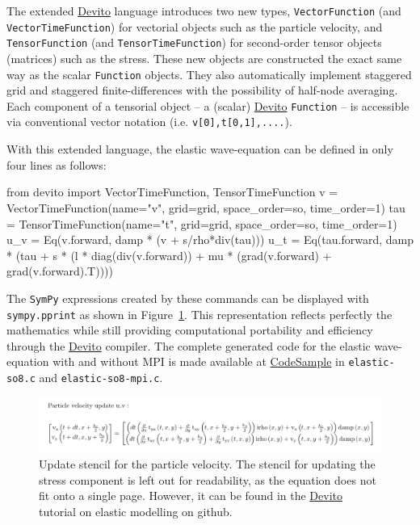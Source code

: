 \documentclass[conference]{IEEEtran}
\begin{document}
The extended \href{https://github.com/devitocodes/devito}{Devito}
language introduces two new types, \texttt{VectorFunction} (and
\texttt{VectorTimeFunction}) for vectorial objects such as the particle
velocity, and \texttt{TensorFunction} (and \texttt{TensorTimeFunction})
for second-order tensor objects (matrices) such as the stress. These new
objects are constructed the exact same way as the scalar
\texttt{Function} objects. They also automatically implement staggered
grid and staggered finite-differences with the possibility of half-node
averaging. Each component of a tensorial object -- a (scalar)
\href{https://github.com/devitocodes/devito}{Devito} \texttt{Function}
-- is accessible via conventional vector notation (i.e.
\texttt{v{[}0{]},\phantom{\ }t{[}0,1{]},....}).

With this extended language, the elastic wave-equation can be defined in
only four lines as follows:

\begin{python}
from devito import VectorTimeFunction,
                   TensorTimeFunction
v = VectorTimeFunction(name="v", grid=grid,
                       space_order=so,
                       time_order=1)
tau = TensorTimeFunction(name="t", grid=grid,
                         space_order=so,
                         time_order=1)
u_v = Eq(v.forward,
         damp * (v + s/rho*div(tau)))
u_t = Eq(tau.forward,
         damp * (tau + s * (l * diag(div(v.forward)) + mu * (grad(v.forward) + grad(v.forward).T))))
\end{python}

The \texttt{SymPy} expressions created by these commands can be
displayed with \texttt{sympy.pprint} as shown in
Figure~\ref{PrettyElas}. This representation reflects perfectly the
mathematics while still providing computational portability and
efficiency through the
\href{https://github.com/devitocodes/devito}{Devito} compiler. The
complete generated code for the elastic wave-equation with and without
MPI is made available at
\href{https://github.com/mloubout/SC20Paper/tree/master/gencode}{CodeSample}
in \texttt{elastic-so8.c} and \texttt{elastic-so8-mpi.c}.

\begin{figure}
\centering
\includegraphics[width=1.000\hsize]{./Figures/vel_symb.png}
\caption{Update stencil for the particle velocity. The stencil for
updating the stress component is left out for readability, as the
equation does not fit onto a single page. However, it can be found in
the \href{https://github.com/devitocodes/devito}{Devito} tutorial on
elastic modelling on github.}\label{PrettyElas}
\end{figure}
\end{document}
